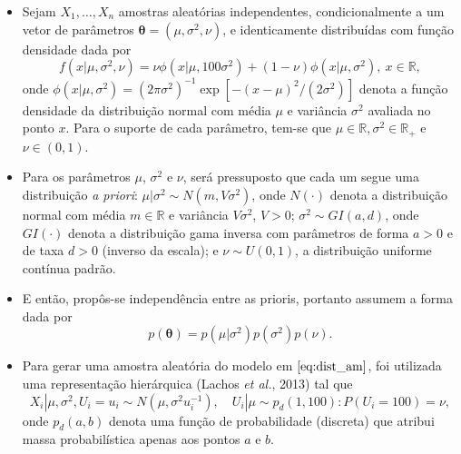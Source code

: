 \documentclass[9pt]{beamer}
\begin{document}
\begin{frame}
\begin{itemize}
\justifying	
\item Sejam $X_{1}, \ldots, X_{n}$ amostras aleatórias independentes, condicionalmente a um vetor de parâmetros $\boldsymbol{\theta} = (\mu, \sigma^2, \nu)$, e identicamente distribuídas com função densidade dada por
\begin{equation}\label{eq:dist_am}
f(x | \mu, \sigma^2, \nu) = \nu \phi(x | \mu, 100 \sigma^2) + (1 - \nu) \phi(x | \mu, \sigma^2), \ x \in \mathbb{R},
\end{equation}
\noindent onde $\phi(x | \mu, \sigma^2) = (2\pi\sigma^2)^{-1} \exp[-(x - \mu)^2/(2\sigma^2)]$ denota a função densidade da distribuição normal com média $\mu$ e variância $\sigma^2$ avaliada no ponto $x$. Para o suporte de cada parâmetro, tem-se que $\mu \in \mathbb{R}, \sigma^2 \in \mathbb{R}_+$ e $\nu \in (0,1)$.
\item Para os parâmetros $\mu$, $\sigma^2$ e $\nu$, será pressuposto que cada um segue uma distribuição \textit{a priori}: $\mu | \sigma^2 \sim{N} (m, V \sigma^2)$, onde $N(\cdot)$ denota a distribuição normal com média $m \in \mathbb{R}$ e variância $V \sigma^2$, $V > 0$; $\sigma^2 \sim{GI} (a,d)$, onde $GI(\cdot)$ denota a distribuição gama inversa com parâmetros de forma $a > 0$ e de taxa $d > 0$ (inverso da escala); e $\nu \sim{U}(0,1)$, a distribuição uniforme contínua padrão.
\end{itemize}
\end{frame}
\begin{frame}
\begin{itemize}
\justifying	
\item E então, propôs-se independência entre as prioris, portanto assumem a forma dada por
\begin{equation}
p(\boldsymbol{\theta}) = p(\mu|\sigma^2) p(\sigma^2)p(\nu).
\end{equation}
\item Para gerar uma amostra aleatória do modelo em $\eqref{eq:dist_am}$, foi utilizada uma representação hierárquica (Lachos \textit{et al.}, 2013) tal que
\begin{equation}
X_i | \mu, \sigma^2, U_{i} = u_i \sim{N}(\mu, \sigma^2 u_i^{-1}), \quad U_i | \mu \sim{p_d}(1,100) : P(U_i = 100) = \nu, \label{eq:hier}
\end{equation}
\noindent onde $p_d(a,b)$ denota uma função de probabilidade (discreta) que atribui massa probabilística apenas aos pontos $a$ e $b$.
\end{itemize}
\end{frame}
\end{document}
